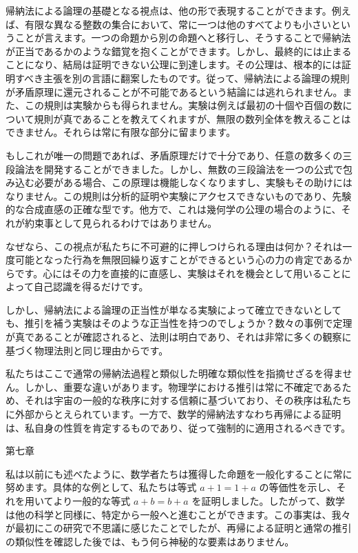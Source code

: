 \documentclass[a4paper,11pt,openany]{ltjsbook}
\begin{document}
帰納法による論理の基礎となる視点は、他の形で表現することができます。例えば、有限な異なる整数の集合において、常に一つは他のすべてよりも小さいということが言えます。一つの命題から別の命題へと移行し、そうすることで帰納法が正当であるかのような錯覚を抱くことができます。しかし、最終的には止まることになり、結局は証明できない公理に到達します。その公理は、根本的には証明すべき主張を別の言語に翻案したものです。従って、帰納法による論理の規則が矛盾原理に還元されることが不可能であるという結論には逃れられません。また、この規則は実験からも得られません。実験は例えば最初の十個や百個の数について規則が真であることを教えてくれますが、無限の数列全体を教えることはできません。それらは常に有限な部分に留まります。

もしこれが唯一の問題であれば、矛盾原理だけで十分であり、任意の数多くの三段論法を開発することができました。しかし、無数の三段論法を一つの公式で包み込む必要がある場合、この原理は機能しなくなりますし、実験もその助けにはなりません。この規則は分析的証明や実験にアクセスできないものであり、先験的な合成直感の正確な型です。他方で、これは幾何学の公理の場合のように、それが約束事として見られるわけではありません。

なぜなら、この視点が私たちに不可避的に押しつけられる理由は何か？それは一度可能となった行為を無限回繰り返すことができるという心の力の肯定であるからです。心にはその力を直接的に直感し、実験はそれを機会として用いることによって自己認識を得るだけです。

しかし、帰納法による論理の正当性が単なる実験によって確立できないとしても、推引を補う実験はそのような正当性を持つのでしょうか？数々の事例で定理が真であることが確認されると、法則は明白であり、それは非常に多くの観察に基づく物理法則と同じ理由からです。

私たちはここで通常の帰納法過程と類似した明確な類似性を指摘せざるを得ません。しかし、重要な違いがあります。物理学における推引は常に不確定であるため、それは宇宙の一般的な秩序に対する信頼に基づいており、その秩序は私たちに外部からとえられています。一方で、数学的帰納法すなわち再帰による証明は、私自身の性質を肯定するものであり、従って強制的に適用されるべきです。


第七章

私は以前にも述べたように、数学者たちは獲得した命題を一般化することに常に努めます。具体的な例として、私たちは等式 \(a + 1 = 1 + a\) の等価性を示し、それを用いてより一般的な等式 \(a + b = b + a\) を証明しました。したがって、数学は他の科学と同様に、特定から一般へと進むことができます。この事実は、我々が最初にこの研究で不思議に感じたことでしたが、再帰による証明と通常の推引の類似性を確認した後では、もう何ら神秘的な要素はありません。
\end{document}

